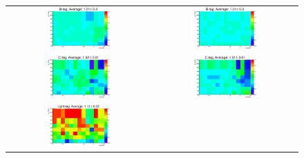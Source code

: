 \begin{figure}
  \begin{center}
  \begin{tabular}{c c}
    \includegraphics[width=0.45\textwidth]{objectsreconstruction/figures/TRFmethod/5closureRebin.eps} &
    \includegraphics[width=0.45\textwidth]{objectsreconstruction/figures/TRFmethod/5myclosureRebin.eps} \\
    \includegraphics[width=0.45\textwidth]{objectsreconstruction/figures/TRFmethod/4closureRebin.eps} &
    \includegraphics[width=0.45\textwidth]{objectsreconstruction/figures/TRFmethod/4myclosureRebin.eps} \\
    \includegraphics[width=0.45\textwidth]{objectsreconstruction/figures/TRFmethod/0closureRebin.eps} &

\end{tabular}
\end{center}
\end{figure}
